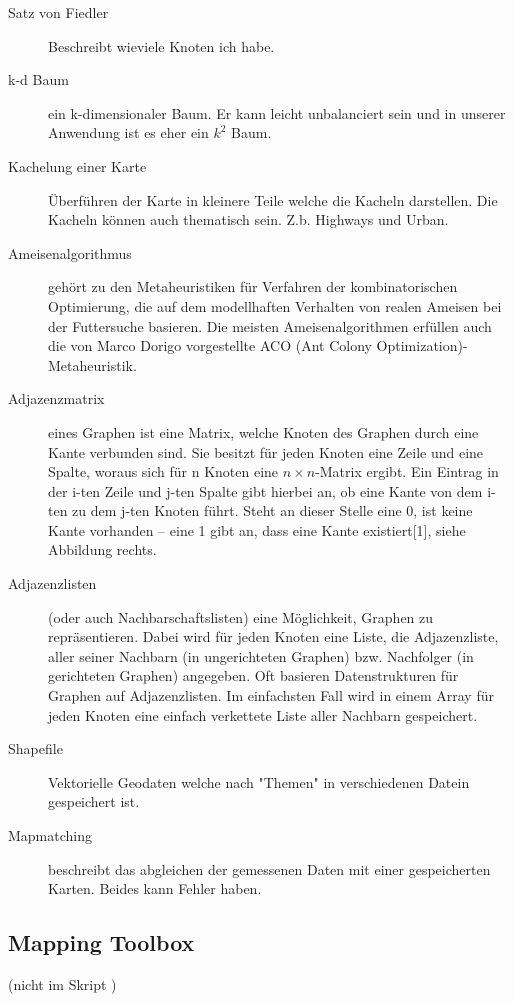 \begin{description}
	\item[Satz von Fiedler] Beschreibt wieviele Knoten ich habe.
	
	\item[k-d Baum] ein k-dimensionaler Baum. Er kann leicht unbalanciert sein und in unserer Anwendung ist es eher ein $k^{2}$ Baum.
	
	\item[Kachelung einer Karte] Überführen der Karte in kleinere Teile welche die Kacheln darstellen. Die Kacheln können auch thematisch sein. Z.b. Highways und Urban.
	
	\item[Ameisenalgorithmus] gehört zu den Metaheuristiken für Verfahren der kombinatorischen Optimierung, die auf dem modellhaften Verhalten von realen Ameisen bei der Futtersuche basieren. Die meisten Ameisenalgorithmen erfüllen auch die von Marco Dorigo vorgestellte ACO (Ant Colony Optimization)-Metaheuristik. 
	
	\item[Adjazenzmatrix] eines Graphen ist eine Matrix, welche Knoten des Graphen durch eine Kante verbunden sind. Sie besitzt für jeden Knoten eine Zeile und eine Spalte, woraus sich für n Knoten eine $n\times n$-Matrix ergibt. Ein Eintrag in der i-ten Zeile und j-ten Spalte gibt hierbei an, ob eine Kante von dem i-ten zu dem j-ten Knoten führt. Steht an dieser Stelle eine 0, ist keine Kante vorhanden – eine 1 gibt an, dass eine Kante existiert[1], siehe Abbildung rechts.
	
	\item[Adjazenzlisten] (oder auch Nachbarschaftslisten) eine Möglichkeit, Graphen zu repräsentieren. Dabei wird für jeden Knoten eine Liste, die Adjazenzliste, aller seiner Nachbarn (in ungerichteten Graphen) bzw. Nachfolger (in gerichteten Graphen) angegeben. Oft basieren Datenstrukturen für Graphen auf Adjazenzlisten. Im einfachsten Fall wird in einem Array für jeden Knoten eine einfach verkettete Liste aller Nachbarn gespeichert.

	\item[Shapefile] Vektorielle Geodaten welche nach "Themen" in verschiedenen Datein gespeichert ist.
	
	\item[Mapmatching] beschreibt das abgleichen der gemessenen Daten mit einer gespeicherten Karten. Beides kann Fehler haben.
\end{description}


\subsection{Mapping Toolbox}
(nicht im Skript )

